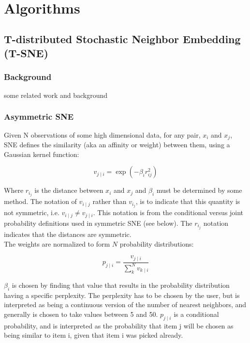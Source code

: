 \part{Algorithms} \label{part:three algorithms}

\chapter{T-distributed Stochastic Neighbor Embedding (T-SNE)}

\section{Background}

some related work and background

\section{Asymmetric SNE}

Given N observations of some high dimensional data, for any pair, $x_i$ and $x_j$, SNE defines the similarity (aka an affinity or weight) between them, using a Gaussian kernel function:

\begin{equation*}
    {v_{j\mid i}} = \exp {(-\beta_i r^2_{ij})} 
\end{equation*}

\noindent Where $r_i_j$ is the distance between $x_i$ and $x_j$ and $\beta_i$ must be determined by some method. The notation of $v_{i \mid j}$ rather than $v_i_j$, is to indicate that this quantity is not symmetric, i.e. $v_{i \mid j} \neq v_{j \mid i}$. This notation is from the conditional versus joint probability definitions used in symmetric SNE (see below). The $r_i_j$ notation indicates that the distances are symmetric.\\

\noindent The weights are normalized to form $N$ probability distributions:

\begin{equation*}
    {p_{j\mid i}} = \frac {v_{j\mid i}} {\sum_k^N v_{k\mid i}}
\end{equation*}

\noindent $\beta_i$ is chosen by finding that value that results in the probability distribution having a specific perplexity. The perplexity has to be chosen by the user, but is interpreted as being a continuous version of the number of nearest neighbors, and generally is chosen to take values between 5 and 50. $p_{j\mid i}$ is a conditional probability, and is interpreted as the probability that item j will be chosen as being similar to item i, given that item i was picked already.


